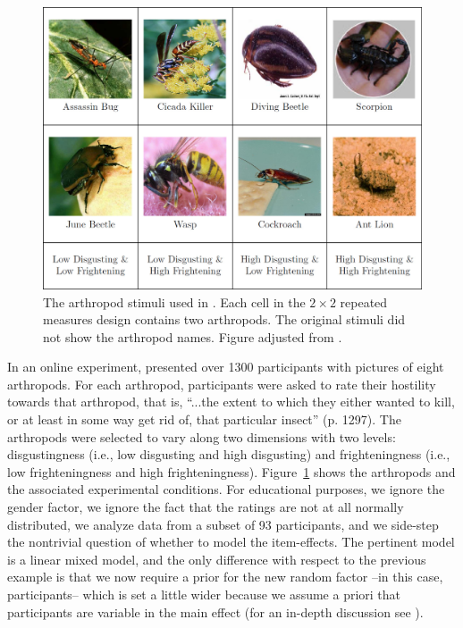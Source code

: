 
\begin{figure}[!t]
    \begin{center}
        \includegraphics[width=1\textwidth]{figs/bi2_ArthropodStimuli.eps}
        \caption{The arthropod stimuli used in \protect {}. Each cell in the $2 \times 2$ repeated measures design contains two arthropods. The original stimuli did not show the arthropod names. Figure adjusted from \protect {}.}
        \label{fig:bi2:ArthropodStimuli}
    \end{center}
\end{figure}

In an online experiment,  presented over 1300 participants with pictures of eight arthropods. For each arthropod, participants were asked to rate their hostility towards that arthropod, that is, ``...the extent to which they either wanted to kill, or at least in some way get rid of, that particular insect'' (p. 1297). The arthropods were selected to vary along two dimensions with two levels: disgustingness (i.e., low disgusting and high disgusting) and frighteningness (i.e., low frighteningness and high frighteningness). Figure~\ref{fig:bi2:ArthropodStimuli} shows the arthropods and the associated experimental conditions. For educational purposes, we ignore the gender factor, we ignore the fact that the ratings are not at all normally distributed, we analyze data from a subset of 93 participants, and we side-step the nontrivial question of whether to model the item-effects. The pertinent model is a linear mixed model, and the only difference with respect to the previous example is that we now require a prior for the new random factor --in this case, participants-- which is set a little wider because we assume a priori that participants are variable in the main effect (for an in-depth discussion see ).

